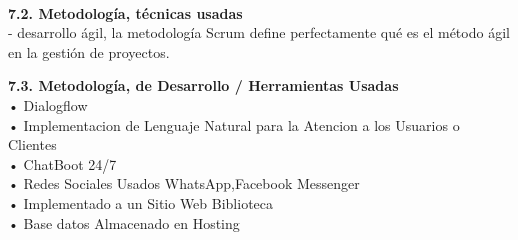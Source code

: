 \begin{flushleft}
\begin{itemize}
\textbf{ }\\
\textbf{7.2.   Metodología, técnicas usadas }\\
-	 desarrollo ágil, la metodología Scrum define perfectamente qué es el método ágil en la gestión de proyectos.

\textbf{7.3.   Metodología, de Desarrollo / Herramientas Usadas}\\
•	 Dialogflow \\
•	 Implementacion de Lenguaje Natural para la Atencion a los Usuarios o Clientes\\
•	 ChatBoot 24/7 \\
•	 Redes Sociales Usados  WhatsApp,Facebook Messenger \\
•	Implementado a un Sitio Web  Biblioteca \\
•	 Base datos Almacenado en Hosting \\


\end{itemize}
\end{flushleft}
